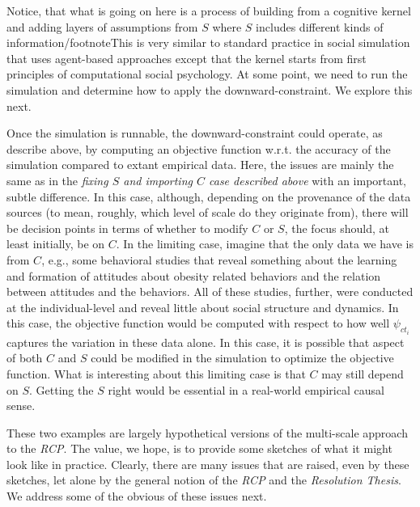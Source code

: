 \documentclass{article}
\begin{document}
Notice, that what is going on here is a process of building from a cognitive kernel and adding layers of assumptions from $S$ where $S$ includes different kinds of information/footnote{This is very similar to standard practice in social simulation that uses agent-based approaches except that the kernel starts from first principles of computational social psychology.}  At some point, we need to run the simulation and determine how to apply the downward-constraint. We explore this next.

Once the simulation is runnable, the downward-constraint could operate, as describe above, by computing an objective function w.r.t. the accuracy of the simulation compared to extant empirical data.  Here, the issues are mainly the same as in the \textit{fixing $S$ and importing $C$ case described above} with an important, subtle difference.  In this case, although, depending on the provenance of the data sources (to mean, roughly, which level of scale do they originate from), there will be decision points in terms of whether to modify $C$ or $S$, the focus should, at least initially, be on $C$.  In the limiting case, imagine that the only data we have is from $C$, e.g., some behavioral studies that reveal something about the learning and formation of attitudes about obesity related behaviors and the relation between attitudes and the behaviors.  All of these studies, further, were conducted at the individual-level and reveal little about social structure and dynamics.  In this case, the objective function would be computed with respect to how well $\psi_{ct_i}$ captures the variation in these data alone.  In this case, it is possible that aspect of both $C$ and $S$ could be modified in the simulation to optimize the objective function.  What is interesting about this limiting case is that $C$ may still depend on $S$.  Getting the $S$ right would be essential in a real-world empirical causal sense.

These two examples are largely hypothetical versions of the multi-scale approach to the \textit{RCP}.  The value, we hope, is to provide some sketches of what it might look like in practice.  Clearly, there are many issues that are raised, even by these sketches, let alone by the general notion of the \textit{RCP} and the \textit{Resolution Thesis}.  We address some of the obvious of these issues next.

\end{document}
